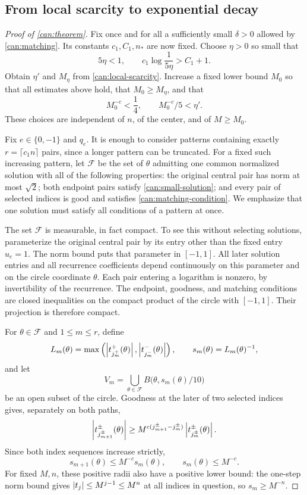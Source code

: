 \subsection{From local scarcity to exponential decay}

\begin{proof}[Proof of \cref{can:theorem}]
Fix once and for all a sufficiently small $\delta>0$ allowed by
\cref{can:matching}.  Its constants $c_1,C_1,n_*$ are now fixed.
Choose $\eta>0$ so small that
\begin{equation}\label{can:eta-choice}
5\eta<1,\qquad
c_1\log\frac1{5\eta}>C_1+1.
\end{equation}
Obtain $\eta'$ and $M_\eta$ from \cref{can:local-scarcity}.  Increase
a fixed lower bound $M_0$ so that all estimates above hold, that
$M_0\ge M_\eta$, and that
\begin{equation}\label{can:radius-choice}
M_0^{-c}<\frac14,\qquad M_0^{-c}/5<\eta'.
\end{equation}
These choices are independent of $n$, of the center, and of $M\ge M_0$.

Fix $e\in\{0,-1\}$ and $q_e$.  It is enough to consider patterns
containing exactly $r=\lceil c_1n\rceil$ pairs, since a longer pattern
can be truncated.  For a fixed such increasing pattern, let
$\mathcal F$ be the set of $\theta$ admitting one common normalized
solution with all of the following properties: the original central
pair has norm at most $\sqrt2$; both endpoint pairs satisfy
\cref{can:small-solution}; and every pair of selected indices is good
and satisfies \cref{can:matching-condition}.  We emphasize that one
solution must satisfy all conditions of a pattern at once.

The set $\mathcal F$ is measurable, in fact compact.  To see this without
selecting solutions, parameterize the original central pair by its entry
other than the fixed entry $u_e=1$.  The norm bound puts that parameter in
$[-1,1]$.  All later solution entries and all recurrence coefficients
depend continuously on this parameter and on the circle coordinate
$\theta$.  Each pair entering a logarithm is nonzero, by invertibility
of the recurrence.  The endpoint, goodness, and matching conditions are
closed inequalities on the compact product of the circle with
$[-1,1]$.  Their projection is therefore compact.

For $\theta\in\mathcal F$ and $1\le m\le r$, define
\[
L_m(\theta)=\max\left(
\left\lvert t_{j_m^+}^+(\theta)\right\rvert,\left\lvert t_{j_m^-}^-(\theta)\right\rvert\right),
\qquad s_m(\theta)=L_m(\theta)^{-1},
\]
and let
\[
V_m=\bigcup_{\theta\in\mathcal F}
 B\bigl(\theta,s_m(\theta)/10\bigr)
\]
be an open subset of the circle.  Goodness at the later of two selected
indices gives, separately on both paths,
\[
\left\lvert t_{j_{m+1}^\pm}^\pm(\theta)\right\rvert
\ge M^{c(j_{m+1}^\pm-j_m^\pm)}
      \left\lvert t_{j_m^\pm}^\pm(\theta)\right\rvert.
\]
Since both index sequences increase strictly,
\begin{equation}\label{can:radius-decay}
s_{m+1}(\theta)\le M^{-c}s_m(\theta),
\qquad s_m(\theta)\le M^{-c}.
\end{equation}
For fixed $M,n$, these positive radii also have a positive lower bound:
the one-step norm bound gives $\left\lvert t_j\right\rvert\le M^{j-1}\le M^n$ at all
indices in question, so $s_m\ge M^{-n}$.


\end{proof}
